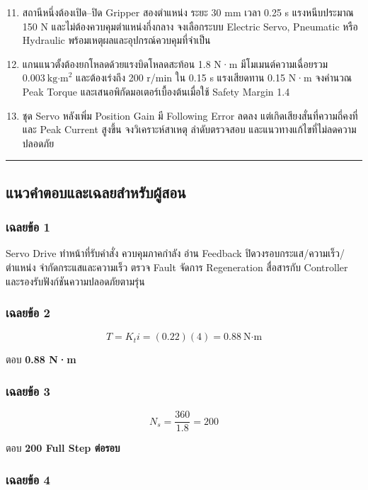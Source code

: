\begin{enumerate}
    \setcounter{enumi}{10}
    \item สถานีหนึ่งต้องเปิด–ปิด Gripper สองตำแหน่ง ระยะ 30 mm เวลา 0.25 s แรงหนีบประมาณ 150 N และไม่ต้องควบคุมตำแหน่งกึ่งกลาง จงเลือกระบบ Electric Servo, Pneumatic หรือ Hydraulic พร้อมเหตุผลและอุปกรณ์ควบคุมที่จำเป็น
    \item แกนแนวตั้งต้องยกโหลดด้วยแรงบิดโหลดสะท้อน 1.8 N·m มีโมเมนต์ความเฉื่อยรวม $0.003\ \text{kg·m}^2$ และต้องเร่งถึง 200 r/min ใน 0.15 s แรงเสียดทาน 0.15 N·m จงคำนวณ Peak Torque และเสนอพิกัดมอเตอร์เบื้องต้นเมื่อใช้ Safety Margin 1.4
    \item ชุด Servo หลังเพิ่ม Position Gain มี Following Error ลดลง แต่เกิดเสียงสั่นที่ความถี่คงที่และ Peak Current สูงขึ้น จงวิเคราะห์สาเหตุ ลำดับตรวจสอบ และแนวทางแก้ไขที่ไม่ลดความปลอดภัย
\end{enumerate}

\par\noindent\rule{\textwidth}{0.4pt}\par

\subsection{แนวคำตอบและเฉลยสำหรับผู้สอน}

\subsubsection{เฉลยข้อ 1}

Servo Drive ทำหน้าที่รับคำสั่ง ควบคุมภาคกำลัง อ่าน Feedback ปิดวงรอบกระแส/ความเร็ว/ตำแหน่ง จำกัดกระแสและความเร็ว ตรวจ Fault จัดการ Regeneration สื่อสารกับ Controller และรองรับฟังก์ชันความปลอดภัยตามรุ่น

\subsubsection{เฉลยข้อ 2}

\[
T=K_ti=(0.22)(4)=0.88\ \text{N·m}
\]

ตอบ \textbf{0.88 N·m}

\subsubsection{เฉลยข้อ 3}

\[
N_s=\frac{360}{1.8}=200
\]

ตอบ \textbf{200 Full Step ต่อรอบ}

\subsubsection{เฉลยข้อ 4}

